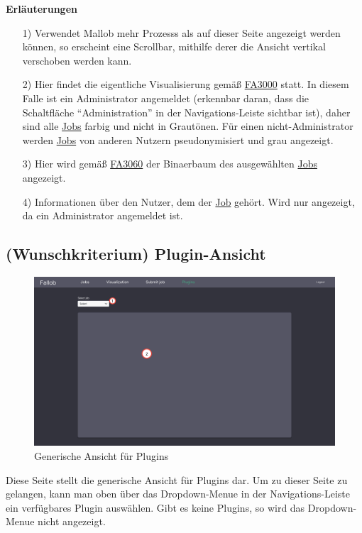 \newpage
\textbf{Erläuterungen}
\begin{itemize}
    \item[1)] Verwendet \gls{Mallob} mehr \glspl{Prozess} als auf dieser Seite angezeigt werden können, so erscheint eine Scrollbar, mithilfe derer die Ansicht vertikal verschoben werden kann.
    \item[2)] Hier findet die eigentliche Visualisierung gemäß \hyperref[FA:Visualisierung:Anzeigen des Systemzustandes]{FA3000} statt. In diesem Falle ist ein \gls{Administrator} angemeldet (erkennbar daran, dass die Schaltfläche \enquote{Administration} in der Navigations-Leiste sichtbar ist), daher sind alle \hyperref[B:Jobs]{Jobs} farbig und nicht in Grautönen. Für einen nicht-\gls{Administrator} werden \hyperref[B:Jobs]{Jobs} von anderen Nutzern pseudonymisiert und grau angezeigt.
    \item[3)] Hier wird gemäß \hyperref[FA:Visualisierung:Anzeigen des Binaerbaumes für einen Job]{FA3060} der \gls{Binaerbaum} des ausgewählten \hyperref[B:Jobs]{Jobs} angezeigt.
    \item[4)] Informationen über den \gls{Nutzer}, dem der \hyperref[B:Jobs]{Job} gehört. Wird nur angezeigt, da ein \gls{Administrator} angemeldet ist.
\end{itemize}


\subsection{(Wunschkriterium) Plugin-Ansicht}
\label{pages:plugin}
\begin{figure}[H]
    \centering
    \includegraphics[width=\textwidth]{images-interface/v4_interface/plugin_page_4.pdf}
    \caption{Generische Ansicht für \glspl{Plugin}}
    \label{fig:plugin-page}
\end{figure}
Diese Seite stellt die generische Ansicht für \glspl{Plugin} dar. Um zu dieser Seite zu gelangen, kann man oben über das \gls{Dropdown-Menue} in der Navigations-Leiste ein verfügbares \gls{Plugin} auswählen. Gibt es keine \glspl{Plugin}, so wird das \gls{Dropdown-Menue} nicht angezeigt. \\

